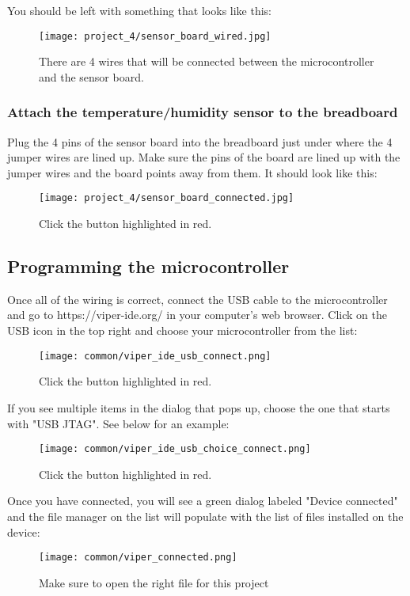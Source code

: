 You should be left with something that looks like this:
\begin{figure}[H]
    \centering
    \texttt{[image: project\_4/sensor\_board\_wired.jpg]}
    \caption{There are 4 wires that will be connected between the microcontroller and the sensor board.}
\end{figure}

\subsubsection{Attach the temperature/humidity sensor to the breadboard}
Plug the 4 pins of the sensor board into the breadboard just under where the 4 jumper wires are lined up. Make sure the pins
of the board are lined up with the jumper wires and the board points away from them. It should look like this:

\begin{figure}[H]
    \centering
    \texttt{[image: project\_4/sensor\_board\_connected.jpg]}
    \caption{Click the button highlighted in red.}
\end{figure}

\subsection{Programming the microcontroller}
Once all of the wiring is correct, connect the USB cable to the microcontroller and go to https://viper-ide.org/ in your
computer's web browser. Click on the USB icon in the top right and choose your microcontroller from the list:

\begin{figure}[H]
    \centering
    \texttt{[image: common/viper\_ide\_usb\_connect.png]}
    \caption{Click the button highlighted in red.}
\end{figure}

If you see multiple items in the dialog that pops up, choose the one that starts with "USB JTAG". See below for an example:
\begin{figure}[H]
    \centering
    \texttt{[image: common/viper\_ide\_usb\_choice\_connect.png]}
    \caption{Click the button highlighted in red.}
\end{figure}

Once you have connected, you will see a green dialog labeled "Device connected" and the file manager on the list
will populate with the list of files installed on the device:
\begin{figure}[H]
    \centering
    \texttt{[image: common/viper\_connected.png]}
    \caption{Make sure to open the right file for this project}
\end{figure}

